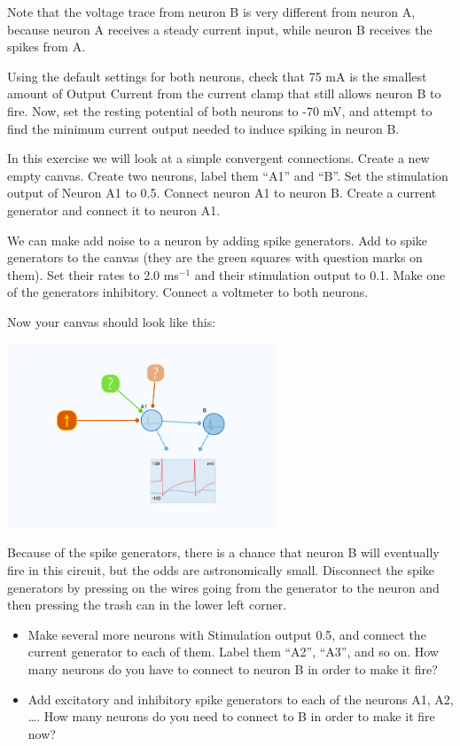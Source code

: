 \begin{Exercise}[title=Small Networks]
\begin{ExePart}
Note that the voltage trace from neuron B is very different from neuron A, because neuron A receives a steady current input, while neuron B receives the spikes from A. 

Using the default settings for both neurons, check that 75 mA is the smallest amount of Output Current from the current clamp that still allows neuron B to fire. Now, set the resting potential of both neurons to -70 mV, and attempt to find the minimum current output needed to induce spiking in neuron B.
\end{ExePart}

\begin{ExePart}
In this exercise we will look at a simple convergent connections. Create a new empty canvas. Create two neurons, label them ``A1'' and ``B''. Set the stimulation output of Neuron A1 to 0.5. Connect neuron A1 to neuron B. Create a current generator and connect it to neuron A1. 

We can make add noise to a neuron by adding spike generators. Add to spike generators to the canvas (they are the green squares with question marks on them). Set their rates to 2.0 ms$^{-1}$ and their stimulation output to 0.1. Make one of the generators inhibitory. Connect a voltmeter to both neurons. 

Now your canvas should look like this: 
\begin{center}
\includegraphics[width=8cm]{two_neurons_noise.png}
\end{center}

Because of the spike generators, there is a chance that neuron B will eventually fire in this circuit, but the odds are astronomically small. Disconnect the spike generators by pressing on the wires going from the generator to the neuron and then pressing the trash can in the lower left corner. 
\begin{itemize}
\item Make several more neurons with Stimulation output 0.5, and connect the current generator to each of them. Label them ``A2'', ``A3'', and so on. How many neurons do you have to connect to neuron B in order to make it fire? 

\item Add excitatory and inhibitory spike generators to each of the neurons A1, A2, \dots. How many neurons do you need to connect to B in order to make it fire now?
\end{itemize}
\end{ExePart}



\end{Exercise}